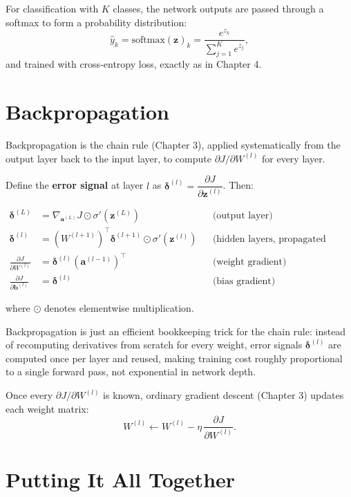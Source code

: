 For classification with $K$ classes, the network outputs are passed
through a softmax to form a probability distribution:
\[
  \hat y_k = \mathrm{softmax}(\mathbf{z})_k = \frac{e^{z_k}}{\sum_{j=1}^K e^{z_j}},
\]
and trained with cross-entropy loss, exactly as in Chapter 4.

\section{Backpropagation}

Backpropagation is the chain rule (Chapter 3), applied systematically from
the output layer back to the input layer, to compute $\partial J/\partial
W^{(l)}$ for every layer.

Define the \textbf{error signal} at layer $l$ as
$\boldsymbol\delta^{(l)} = \dfrac{\partial J}{\partial \mathbf{z}^{(l)}}$.
Then:

\begin{align*}
  \boldsymbol\delta^{(L)} &= \nabla_{\mathbf{a}^{(L)}} J \odot \sigma'\!\left(\mathbf{z}^{(L)}\right) &&\text{(output layer)}\\[4pt]
  \boldsymbol\delta^{(l)} &= \left(W^{(l+1)}\right)^{\!\top}\boldsymbol\delta^{(l+1)} \odot \sigma'\!\left(\mathbf{z}^{(l)}\right) &&\text{(hidden layers, propagated backward)}\\[4pt]
  \frac{\partial J}{\partial W^{(l)}} &= \boldsymbol\delta^{(l)} \left(\mathbf{a}^{(l-1)}\right)^{\!\top} &&\text{(weight gradient)}\\[4pt]
  \frac{\partial J}{\partial \mathbf{b}^{(l)}} &= \boldsymbol\delta^{(l)} &&\text{(bias gradient)}
\end{align*}

where $\odot$ denotes elementwise multiplication.

\begin{keyidea}
Backpropagation is just an efficient bookkeeping trick for the chain rule:
instead of recomputing derivatives from scratch for every weight, error
signals $\boldsymbol\delta^{(l)}$ are computed once per layer and reused,
making training cost roughly proportional to a single forward pass, not
exponential in network depth.
\end{keyidea}

Once every $\partial J/\partial W^{(l)}$ is known, ordinary gradient descent
(Chapter 3) updates each weight matrix:
\[
  W^{(l)} \leftarrow W^{(l)} - \eta\,\frac{\partial J}{\partial W^{(l)}}.
\]

\section{Putting It All Together}

